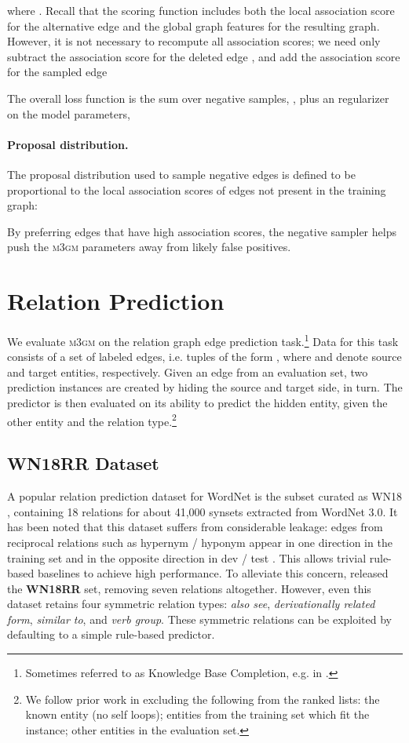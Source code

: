 \documentclass[11pt,twocolumn]{article}
\newcommand{\WN}[0]{WordNet}
\newcommand{\sysname}[0]{\textsc{m3gm}}
\begin{document}
where . Recall that the scoring function  includes both the local association score for the alternative edge and the global graph features for the resulting graph. However, it is not necessary to recompute all association scores; we need only subtract the association score for the deleted edge , and add the association score for the sampled edge 

The overall loss function is the sum over  negative samples, , plus an  regularizer on the model parameters,


\paragraph{Proposal distribution.} The proposal distribution  used to sample negative edges is defined to be proportional to the local association scores
of edges not present in the training graph:

By preferring edges that have high association scores, the negative sampler helps push the \sysname{} parameters away from likely false positives.

 
\section{Relation Prediction}
\label{sec:exp}

We evaluate \sysname{} on the relation graph edge prediction task.\footnote{Sometimes referred to as Knowledge Base Completion, e.g. in .}
Data for this task consists of a set of labeled edges, i.e. tuples of the form , where  and  denote source and target entities,
respectively.
Given an edge from an evaluation set, two prediction instances are created by hiding the source and target side, in turn.
The predictor is then evaluated on its ability to predict the hidden entity, given the other entity and the relation type.\footnote{We follow prior work in excluding the following from the ranked lists: the known entity (no self loops); entities from the training set which fit the instance; other entities in the evaluation set.}

\subsection{WN18RR Dataset}
\label{ssec:wnrr}

A popular relation prediction dataset for \WN{} is the subset curated as WN18 \cite{bordes2013translating,bordes2014semantic}, containing 18 relations for about 41,000 synsets extracted from \WN{} 3.0.
It has been noted that this dataset suffers from considerable leakage: edges from reciprocal relations such as hypernym / hyponym appear in one direction in the training set and in the opposite direction in dev / test  \cite{SocherChenManningNg2013,dettmers2018conve}.
This allows trivial rule-based baselines to achieve high performance.
To alleviate this concern,  released the \textbf{WN18RR} set, removing seven relations altogether.
However, even this dataset retains four symmetric relation types: \textit{also see}, \textit{derivationally related form}, \textit{similar to}, and \textit{verb group}.
These symmetric relations can be exploited by defaulting to a simple rule-based predictor.
\end{document}
